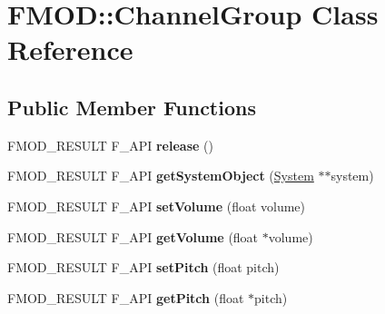\hypertarget{class_f_m_o_d_1_1_channel_group}{}\section{F\+M\+OD\+:\+:Channel\+Group Class Reference}
\label{class_f_m_o_d_1_1_channel_group}
\subsection*{Public Member Functions}
\begin{DoxyCompactItemize}
\item 
F\+M\+O\+D\+\_\+\+R\+E\+S\+U\+LT F\+\_\+\+A\+PI {\bfseries release} ()\hypertarget{class_f_m_o_d_1_1_channel_group_a4f7fc3cf21050e3cd5e84f8a2f9a0fc9}{}\label{class_f_m_o_d_1_1_channel_group_a4f7fc3cf21050e3cd5e84f8a2f9a0fc9}

\item 
F\+M\+O\+D\+\_\+\+R\+E\+S\+U\+LT F\+\_\+\+A\+PI {\bfseries get\+System\+Object} (\hyperlink{class_f_m_o_d_1_1_system}{System} $\ast$$\ast$system)\hypertarget{class_f_m_o_d_1_1_channel_group_ad31856ea134d39c0757e6b6b2abeabcc}{}\label{class_f_m_o_d_1_1_channel_group_ad31856ea134d39c0757e6b6b2abeabcc}

\item 
F\+M\+O\+D\+\_\+\+R\+E\+S\+U\+LT F\+\_\+\+A\+PI {\bfseries set\+Volume} (float volume)\hypertarget{class_f_m_o_d_1_1_channel_group_ab2202bf291f95b99cb8f69796c7b5405}{}\label{class_f_m_o_d_1_1_channel_group_ab2202bf291f95b99cb8f69796c7b5405}

\item 
F\+M\+O\+D\+\_\+\+R\+E\+S\+U\+LT F\+\_\+\+A\+PI {\bfseries get\+Volume} (float $\ast$volume)\hypertarget{class_f_m_o_d_1_1_channel_group_ac3ccba7965c6b5591dc355e4a785f145}{}\label{class_f_m_o_d_1_1_channel_group_ac3ccba7965c6b5591dc355e4a785f145}

\item 
F\+M\+O\+D\+\_\+\+R\+E\+S\+U\+LT F\+\_\+\+A\+PI {\bfseries set\+Pitch} (float pitch)\hypertarget{class_f_m_o_d_1_1_channel_group_af765eda64e3ab4dc771204b1c1850d42}{}\label{class_f_m_o_d_1_1_channel_group_af765eda64e3ab4dc771204b1c1850d42}

\item 
F\+M\+O\+D\+\_\+\+R\+E\+S\+U\+LT F\+\_\+\+A\+PI {\bfseries get\+Pitch} (float $\ast$pitch)\hypertarget{class_f_m_o_d_1_1_channel_group_a7f209b70b88c1f044ae9ee7debf33834}{}\label{class_f_m_o_d_1_1_channel_group_a7f209b70b88c1f044ae9ee7debf33834}


\end{DoxyCompactItemize}
